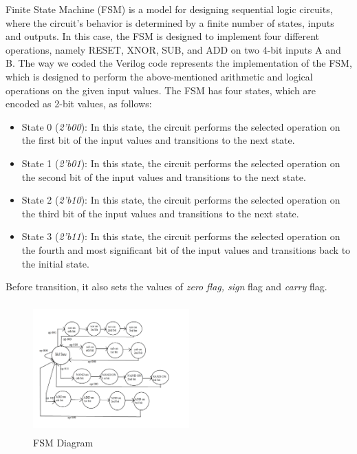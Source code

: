 Finite State Machine (FSM) is a model for designing sequential logic circuits,
where the circuit's behavior is determined by a finite number of states, inputs and outputs.
In this case, the FSM is designed to implement four different operations,
namely RESET, XNOR, SUB, and ADD on two 4-bit inputs A and B.
The way we coded the Verilog code represents the implementation of the FSM,
which is designed to perform the above-mentioned arithmetic and logical operations on the given input values.
The FSM has four states, which are encoded as 2-bit values, as follows:

\begin{itemize}
    \item State 0 (\textit{2'b00}): In this state, the circuit performs the selected operation on the first bit of the input values and transitions to the next state.
    \item State 1 (\textit{2'b01}): In this state, the circuit performs the selected operation on the second bit of the input values and transitions to the next state.
    \item State 2 (\textit{2'b10}): In this state, the circuit performs the selected operation on the third bit of the input values and transitions to the next state.
    \item State 3 (\textit{2'b11}): In this state, the circuit performs the selected operation on the fourth and most significant bit of the input values and transitions back to the initial state.
\end{itemize}

Before transition, it also sets the values of \textit{zero} \textit{flag, sign} flag and \textit{carry} flag.

\begin{figure}[htbp]
    \centerline{\includegraphics[height=5cm,width=6cm]{figures/fsm}}
    \caption{FSM Diagram}
    \label{fig:FSM}
\end{figure}

